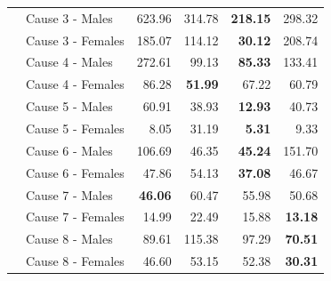 \begin{center}
\begin{small}
\begin{longtable}{@{}llrrrr@{}}
& Cause 3 - Males & 623.96 & 314.78 & \textbf{218.15} & 298.32 \\
& Cause 3 - Females & 185.07 & 114.12 & \textbf{30.12} & 208.74 \\
& Cause 4 - Males & 272.61 & 99.13 & \textbf{85.33} & 133.41 \\
& Cause 4 - Females & 86.28 & \textbf{51.99} & 67.22 & 60.79 \\
& Cause 5 - Males & 60.91 & 38.93 & \textbf{12.93} & 40.73 \\
& Cause 5 - Females & 8.05 & 31.19 & \textbf{5.31} & 9.33 \\
& Cause 6 - Males & 106.69 & 46.35 & \textbf{45.24} & 151.70 \\
& Cause 6 - Females & 47.86 & 54.13 & \textbf{37.08} & 46.67 \\
& Cause 7 - Males & \textbf{46.06} & 60.47 & 55.98 & 50.68 \\
& Cause 7 - Females & 14.99 & 22.49 & 15.88 & \textbf{13.18} \\
& Cause 8 - Males & 89.61 & 115.38 & 97.29 & \textbf{70.51} \\
& Cause 8 - Females & 46.60 & 53.15 & 52.38 & \textbf{30.31} \\
\bottomrule
\end{longtable}
\end{small}
\end{center}
